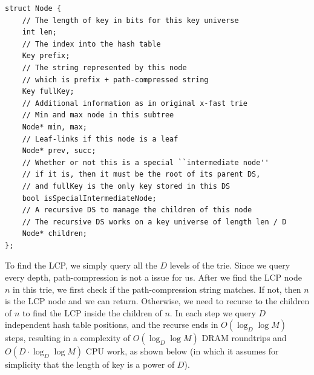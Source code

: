 \documentclass[11pt, usletter]{article}
\begin{document}
\singlespacing\begin{codebox}
\begin{verbatim}
struct Node {
    // The length of key in bits for this key universe
    int len;
    // The index into the hash table
    Key prefix;
    // The string represented by this node
    // which is prefix + path-compressed string
    Key fullKey;
    // Additional information as in original x-fast trie
    // Min and max node in this subtree
    Node* min, max;
    // Leaf-links if this node is a leaf
    Node* prev, succ;
    // Whether or not this is a special ``intermediate node''
    // if it is, then it must be the root of its parent DS,
    // and fullKey is the only key stored in this DS
    bool isSpecialIntermediateNode;
    // A recursive DS to manage the children of this node
    // The recursive DS works on a key universe of length len / D
    Node* children;
};
\end{verbatim}
\end{codebox}\doublespacing

To find the LCP, we simply query all the $D$ levels of the trie. 
Since we query every depth, path-compression is not a issue for us.
After we find the LCP node $n$ in this trie, we first check if the path-compression string matches. 
If not, then $n$ is the LCP node and we can return. Otherwise, 
we need to recurse to the children of $n$ to find the LCP inside the children of $n$. 
In each step we query $D$ independent hash table positions, and the recurse ends in $O(\log_D\log M)$ steps, 
resulting in a complexity of $O(\log_D\log M)$ DRAM roundtrips and $O(D\cdot\log_D\log M)$ CPU work,
as shown below (in which it assumes for simplicity that the length of key is a power of $D$).
\end{document}
